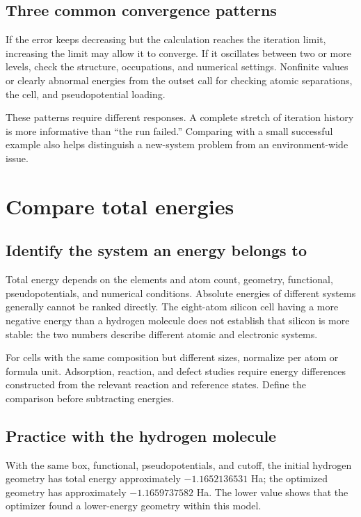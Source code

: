 \subsection{Three common convergence patterns}

If the error keeps decreasing but the calculation reaches the iteration limit, increasing the limit may allow it to converge. If it oscillates between two or more levels, check the structure, occupations, and numerical settings. Nonfinite values or clearly abnormal energies from the outset call for checking atomic separations, the cell, and pseudopotential loading.

These patterns require different responses. A complete stretch of iteration history is more informative than ``the run failed.'' Comparing with a small successful example also helps distinguish a new-system problem from an environment-wide issue.

\section{Compare total energies}

\subsection{Identify the system an energy belongs to}

Total energy depends on the elements and atom count, geometry, functional, pseudopotentials, and numerical conditions. Absolute energies of different systems generally cannot be ranked directly. The eight-atom silicon cell having a more negative energy than a hydrogen molecule does not establish that silicon is more stable: the two numbers describe different atomic and electronic systems.

For cells with the same composition but different sizes, normalize per atom or formula unit. Adsorption, reaction, and defect studies require energy differences constructed from the relevant reaction and reference states. Define the comparison before subtracting energies.

\subsection{Practice with the hydrogen molecule}

With the same box, functional, pseudopotentials, and cutoff, the initial hydrogen geometry has total energy approximately $-1.1652136531$ Ha; the optimized geometry has approximately $-1.1659737582$ Ha. The lower value shows that the optimizer found a lower-energy geometry within this model.

